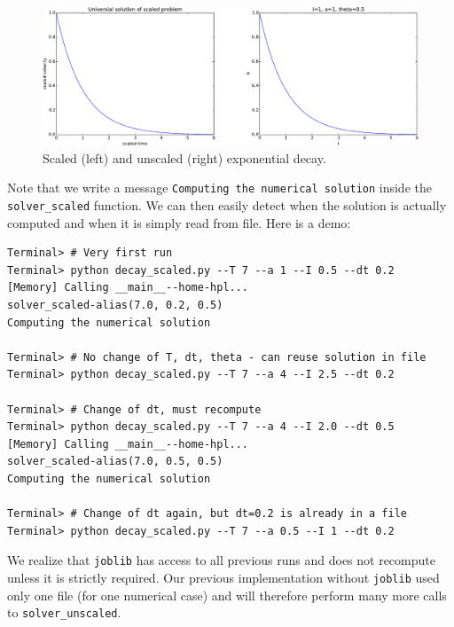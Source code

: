 \documentclass[graybox,envcountchap,sectrefs,final]{svmonodo}
\begin{document}
\begin{figure}[!ht]  %
  \centerline{\includegraphics[width=1.0\linewidth]{fig-scaling/decay.pdf}}
  \caption{
  Scaled (left) and unscaled (right) exponential decay. \label{sec:decay:fig:simplest}
  }
\end{figure}



Note that we write a message \texttt{Computing the numerical solution} inside
the \Verb!solver_scaled! function. We can then easily detect when
the solution is actually computed and when it is simply read from file.
Here is a demo:

\begin{Verbatim}[frame=lines,label=\fbox{{\tiny Terminal}},framesep=2.5mm,framerule=0.7pt,fontsize=\fontsize{9pt}{9pt}]
Terminal> # Very first run
Terminal> python decay_scaled.py --T 7 --a 1 --I 0.5 --dt 0.2
[Memory] Calling __main__--home-hpl...
solver_scaled-alias(7.0, 0.2, 0.5)
Computing the numerical solution

Terminal> # No change of T, dt, theta - can reuse solution in file
Terminal> python decay_scaled.py --T 7 --a 4 --I 2.5 --dt 0.2

Terminal> # Change of dt, must recompute
Terminal> python decay_scaled.py --T 7 --a 4 --I 2.0 --dt 0.5
[Memory] Calling __main__--home-hpl...
solver_scaled-alias(7.0, 0.5, 0.5)
Computing the numerical solution

Terminal> # Change of dt again, but dt=0.2 is already in a file
Terminal> python decay_scaled.py --T 7 --a 0.5 --I 1 --dt 0.2
\end{Verbatim}

We realize that \texttt{joblib} has access to all previous runs and does not
recompute unless it is strictly required. Our previous implementation
without \texttt{joblib}
used only one file (for one numerical case)
and will therefore perform many more calls to
\Verb!solver_unscaled!.
\end{document}

